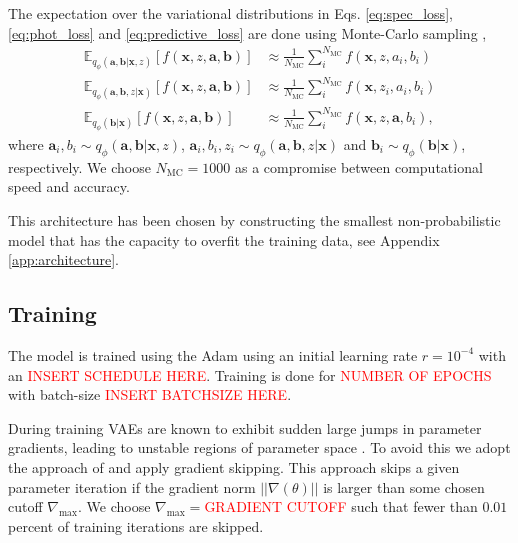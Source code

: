 The expectation over the variational distributions in Eqs. \ref{eq:spec_loss}, \ref{eq:phot_loss} and \ref{eq:predictive_loss} are done using Monte-Carlo sampling \citep{kingmaAutoEncodingVariationalBayes2022, rezendeStochasticBackpropagationApproximate2014},
\begin{align}
    \mathbb{E}_{q_\phi(\mathbf{a},\mathbf{b}|\mathbf{x},z)}\left[f(\mathbf{x},z,\mathbf{a},\mathbf{b})\right] &\approx \frac{1}{N_{\text{MC}}} \sum_i^{N_{\text{MC}}} f(\mathbf{x},z,a_i,b_i) \\
    \mathbb{E}_{q_\phi(\mathbf{a},\mathbf{b},z|\mathbf{x})}\left[f(\mathbf{x},z,\mathbf{a},\mathbf{b})\right] &\approx \frac{1}{N_{\text{MC}}} \sum_i^{N_{\text{MC}}} f(\mathbf{x},z_i,a_i,b_i) \\
    \mathbb{E}_{q_\phi(\mathbf{b}|\mathbf{x})}\left[f(\mathbf{x},z,\mathbf{a},\mathbf{b})\right] &\approx \frac{1}{N_{\text{MC}}} \sum_i^{N_{\text{MC}}} f(\mathbf{x},z,\mathbf{a},b_i),
\end{align}
where $\mathbf{a}_i, b_i \sim q_\phi(\mathbf{a},\mathbf{b}|\mathbf{x},z)$, $\mathbf{a}_i, b_i, z_i \sim q_\phi(\mathbf{a},\mathbf{b},z|\mathbf{x})$ and $\mathbf{b}_i \sim q_\phi(\mathbf{b}|\mathbf{x})$, respectively. We choose $N_{\text{MC}} = 1000$ as a compromise between computational speed and accuracy. 

This architecture has been chosen by constructing the smallest non-probabilistic model that has the capacity to overfit the training data, see Appendix \ref{app:architecture}.

\subsection{Training}
\label{subsec:training}

The model is trained using the Adam \citep{kingmaAdamMethodStochastic2017} using an initial learning rate $r=10^{-4}$ with an \textcolor{red}{INSERT SCHEDULE HERE}. Training is done for \textcolor{red}{NUMBER OF EPOCHS} with batch-size \textcolor{red}{INSERT BATCHSIZE HERE}. 

During training VAEs are known to exhibit sudden large jumps in parameter gradients, leading to unstable regions of parameter space \citep{childVeryDeepVAEs2021, vahdatNVAEDeepHierarchical2021}. To avoid this we adopt the approach of \cite{childVeryDeepVAEs2021} and apply gradient skipping. This approach skips a given parameter iteration if the gradient norm $||\nabla(\theta)||$ is larger than some chosen cutoff $\nabla_\text{max}$. We choose $\nabla_\text{max}=$\textcolor{red}{GRADIENT CUTOFF} such that fewer than $0.01$ percent of training iterations are skipped.

